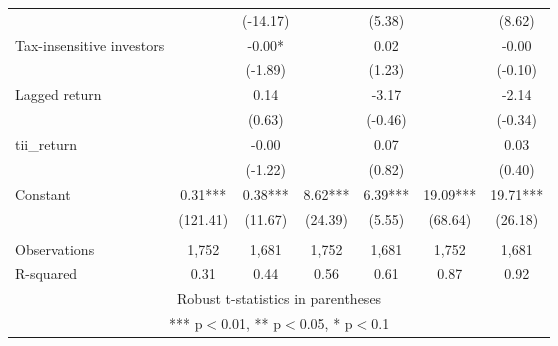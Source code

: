 \documentclass[]{article}
\begin{document}
\begin{tabular}{lcccccc}
 &  & (-14.17) &  & (5.38) &  & (8.62) \\
Tax-insensitive investors &  & -0.00* &  & 0.02 &  & -0.00 \\
 &  & (-1.89) &  & (1.23) &  & (-0.10) \\
Lagged return &  & 0.14 &  & -3.17 &  & -2.14 \\
 &  & (0.63) &  & (-0.46) &  & (-0.34) \\
tii\_return &  & -0.00 &  & 0.07 &  & 0.03 \\
 &  & (-1.22) &  & (0.82) &  & (0.40) \\
Constant & 0.31*** & 0.38*** & 8.62*** & 6.39*** & 19.09*** & 19.71*** \\
 & (121.41) & (11.67) & (24.39) & (5.55) & (68.64) & (26.18) \\
 &  &  &  &  &  &  \\
Observations & 1,752 & 1,681 & 1,752 & 1,681 & 1,752 & 1,681 \\
 R-squared & 0.31 & 0.44 & 0.56 & 0.61 & 0.87 & 0.92 \\ \hline
\multicolumn{7}{c}{ Robust t-statistics in parentheses} \\
\multicolumn{7}{c}{ *** p$<$0.01, ** p$<$0.05, * p$<$0.1} \\
\end{tabular}
\end{document}
